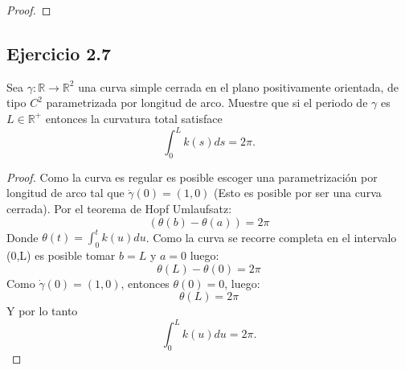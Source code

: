 \documentclass[12pt]{article}
\begin{document}
\begin{proof}
\end{proof}
\subsection*{Ejercicio 2.7}
Sea ${\gamma}:\mathbb{R} \rightarrow \mathbb{R}^2$ una curva simple cerrada en el plano  positivamente orientada, de tipo $C^2$ parametrizada por longitud de arco. Muestre que si el periodo de $\gamma$ es $L \in \mathbb{R}^+$ entonces la curvatura total satisface
\begin{equation*}
\int_{0}^{L} k(s)ds = 2\pi.
\end{equation*}
\begin{proof}
Como la curva es regular es posible escoger una parametrizaci\'on por longitud de arco tal que $\dot{\gamma}(0)=(1,0)$ (Esto es posible por ser una curva cerrada). Por el teorema de Hopf Umlaufsatz: %
\begin{equation*}
(\theta(b)-\theta(a))=2\pi
\end{equation*}
Donde $\theta(t)=\int_{0}^{t} k(u) du$. Como la curva se recorre completa en el intervalo (0,L) es posible tomar $b=L$ y $a=0$ luego:
\begin{equation*}
\theta(L)-\theta(0)=2\pi
\end{equation*}
Como $\dot{\gamma}(0)=(1,0)$, entonces $\theta(0)=0$, luego: %
\begin{equation*}
\theta(L)=2\pi
\end{equation*}
Y por lo tanto
\begin{equation*}
\int_{0}^{L} k(u) du = 2\pi.
\end{equation*}
\end{proof}
\vspace{2in} %

\vspace{3in}
\end{document}

